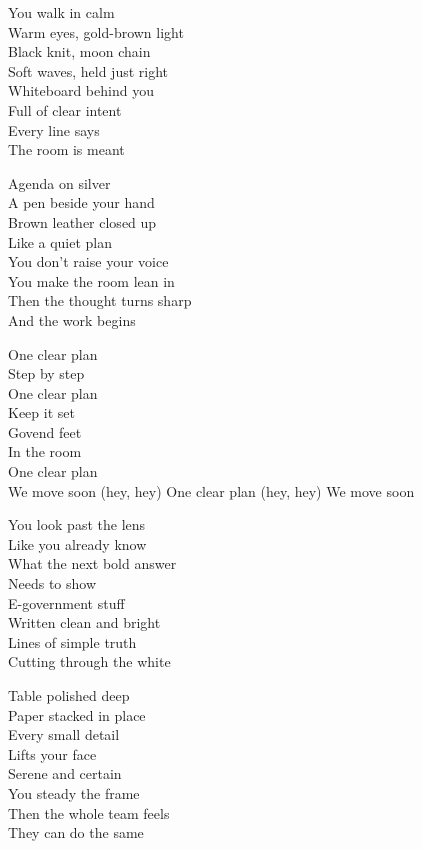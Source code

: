 \begin{lyrics}
You walk in calm\\
Warm eyes, gold-brown light\\
Black knit, moon chain\\
Soft waves, held just right\\
Whiteboard behind you\\
Full of clear intent\\
Every line says\\
The room is meant

Agenda on silver\\
A pen beside your hand\\
Brown leather closed up\\
Like a quiet plan\\
You don’t raise your voice\\
You make the room lean in\\
Then the thought turns sharp\\
And the work begins

One clear plan\\
Step by step\\
One clear plan\\
Keep it set\\
Govend feet\\
In the room\\
One clear plan\\
We move soon
(hey, hey) One clear plan
(hey, hey) We move soon

You look past the lens\\
Like you already know\\
What the next bold answer\\
Needs to show\\
E-government stuff\\
Written clean and bright\\
Lines of simple truth\\
Cutting through the white

Table polished deep\\
Paper stacked in place\\
Every small detail\\
Lifts your face\\
Serene and certain\\
You steady the frame\\
Then the whole team feels\\
They can do the same


\end{lyrics}
